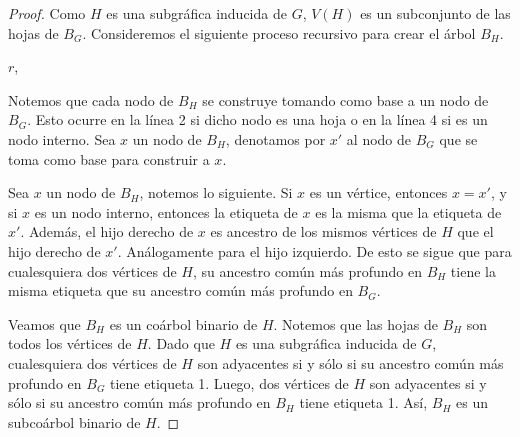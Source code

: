 \begin{proof}
Como $H$ es una subgráfica inducida de $G$, $V(H)$ es un subconjunto de las hojas de $B_G$. Consideremos el siguiente proceso recursivo para crear el árbol $B_H$.

\begin{algorithm}[H]
\DontPrintSemicolon 
{}
    \Return $r$,
\end{algorithm}

Notemos que cada nodo de $B_H$ se construye tomando como base a un nodo de $B_G$. Esto ocurre en la línea 2 si dicho nodo es una hoja o en la línea 4 si es un nodo interno. Sea $x$ un nodo de $B_H$, denotamos por $x'$ al nodo de $B_G$ que se toma como base para construir a $x$.

Sea $x$ un nodo de $B_H$, notemos lo siguiente. Si $x$ es un vértice, entonces $x = x'$, y si $x$ es un nodo interno, entonces la etiqueta de $x$ es la misma que la etiqueta de $x'$. Además, el hijo derecho de $x$ es ancestro de los mismos vértices de $H$ que el hijo derecho de $x'$. Análogamente para el hijo izquierdo. De esto se sigue que para cualesquiera dos vértices de $H$, su ancestro común más profundo en $B_H$ tiene la misma etiqueta que su ancestro común más profundo en $B_G$. 

Veamos que $B_H$ es un coárbol binario de $H$. Notemos que las hojas de $B_H$ son todos los vértices de $H$. Dado que $H$ es una subgráfica inducida de $G$, cualesquiera dos vértices de $H$ son adyacentes si y sólo si su ancestro común más profundo en $B_G$ tiene etiqueta 1. Luego, dos vértices de $H$ son adyacentes si y sólo si su ancestro común más profundo en $B_H$ tiene etiqueta 1. Así, $B_H$ es un subcoárbol binario de $H$.


\end{proof}
